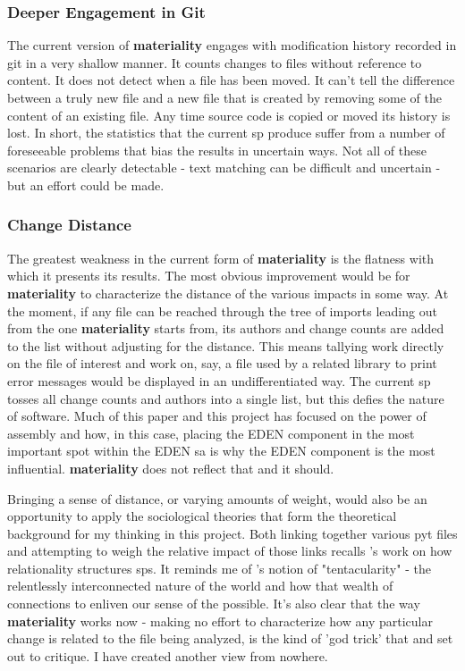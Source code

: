 \documentclass[a4paper,man,natbib,floatsintext]{apa6}
\begin{document}
  \subsubsection{Deeper Engagement in Git}
  The current version of \textbf{materiality} engages with modification history recorded in git in a very shallow manner. It counts changes to files without reference to content. It does not detect when a file has been moved. It can't tell the difference between a truly new file and a new file that is created by removing some of the content of an existing file. Any time source code is copied or moved its history is lost. In short, the statistics that the current \gls{sp} produce suffer from a number of foreseeable problems that bias the results in uncertain ways. Not all of these scenarios are clearly detectable - text matching can be difficult and uncertain - but an effort could be made.

  \subsubsection{Change Distance}
  The greatest weakness in the current form of \textbf{materiality} is the flatness with which it presents its results. The most obvious improvement would be for \textbf{materiality} to characterize the distance of the various impacts in some way. At the moment, if any file can be reached through the tree of imports leading out from the one \textbf{materiality} starts from, its authors and change counts are added to the list without adjusting for the distance. This means tallying work directly on the file of interest and work on, say, a file used by a related library to print error messages would be displayed in an undifferentiated way. The current \gls{sp} tosses all change counts and authors into a single list, but this defies the nature of software. Much of this paper and this project has focused on the power of assembly and how, in this case, placing the \gls{EDEN} component in the most important spot within the \gls{EDEN} \gls{sa} is why the \gls{EDEN} component is the most influential. \textbf{materiality} does not reflect that and it should.

  Bringing a sense of distance, or varying amounts of weight, would also be an opportunity to apply the sociological theories that form the theoretical background for my thinking in this project. Both linking together various \Gls{pyt} files and attempting to weigh the relative impact of those links recalls \citet{Mackenzie2006-hb}'s work on how relationality structures \glspl{sp}. It reminds me of \citet{Haraway2016-nc}'s notion of "tentacularity" - the relentlessly interconnected nature of the world and how that wealth of connections to enliven our sense of the possible. It's also clear that the way \textbf{materiality} works now - making no effort to characterize how any particular change is related to the file being analyzed, is the kind of 'god trick' that \citet{Harding1992-od} and \citet{Haraway1988-nh} set out to critique. I have created another view from nowhere.
\end{document}
